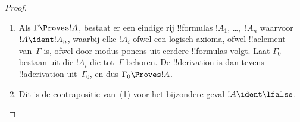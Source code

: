 \documentclass[../../../include/open-logic-section]{subfiles}
\begin{document}
\begin{proof}
  \begin{enumerate}
    \item Als $\Gamma \Proves !A$, bestaat er een eindige rij
      !!{formula}s $!A_1$, \dots,~$!A_n$ waarvoor $!A \ident !A_n$,
      waarbij elke $!A_i$ ofwel een logisch axioma, ofwel !!a{element}
      van~$\Gamma$ is, ofwel door modus ponens uit eerdere
      !!{formula}s volgt. Laat $\Gamma_0$ bestaan uit die $!A_i$ die
      tot~$\Gamma$ behoren. De !!{derivation} is dan tevens
      !!a{derivation} uit~$\Gamma_0$, en dus $\Gamma_0 \Proves !A$.
    \item Dit is de contrapositie van~(1) voor het bijzondere geval
      $!A \ident \lfalse$.
\end{enumerate}
\end{proof}
\end{document}
